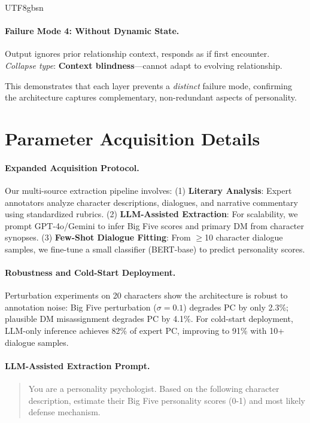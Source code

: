 \documentclass[11pt]{article}
\begin{document}
\begin{CJK*}{UTF8}{gbsn}
\paragraph{Failure Mode 4: Without Dynamic State.}
Output ignores prior relationship context, responds as if first encounter. \\
\textit{Collapse type}: \textbf{Context blindness}---cannot adapt to evolving relationship.

This demonstrates that each layer prevents a \textit{distinct} failure mode, confirming the architecture captures complementary, non-redundant aspects of personality.

\section{Parameter Acquisition Details}
\label{sec:param_acquisition}

\paragraph{Expanded Acquisition Protocol.}
Our multi-source extraction pipeline involves:
(1) \textbf{Literary Analysis}: Expert annotators analyze character descriptions, dialogues, and narrative commentary using standardized rubrics.
(2) \textbf{LLM-Assisted Extraction}: For scalability, we prompt GPT-4o/Gemini to infer Big Five scores and primary DM from character synopses.
(3) \textbf{Few-Shot Dialogue Fitting}: From $\geq$10 character dialogue samples, we fine-tune a small classifier (BERT-base) to predict personality scores.

\paragraph{Robustness and Cold-Start Deployment.}
Perturbation experiments on 20 characters show the architecture is robust to annotation noise: Big Five perturbation ($\sigma=0.1$) degrades PC by only 2.3\%; plausible DM misassignment degrades PC by 4.1\%. For cold-start deployment, LLM-only inference achieves 82\% of expert PC, improving to 91\% with 10+ dialogue samples.

\paragraph{LLM-Assisted Extraction Prompt.}
\begin{quote}
\small
You are a personality psychologist. Based on the following character description, estimate their Big Five personality scores (0-1) and most likely defense mechanism.


\end{quote}
\end{CJK*}
\end{document}
